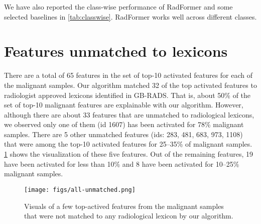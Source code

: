 \documentclass[twocolumn,final]{elsarticle}
\def\myarch{RadFormer\xspace}
\begin{document}
We have also reported the class-wise performance of \myarch and some selected baselines in \cref{tab:classwise}. \myarch works well across different classes. 

\section{Features unmatched to lexicons}
%
There are a total of 65 features in the set of top-10 activated features for each of the malignant samples. Our algorithm matched 32 of the top activated features to radiologist approved lexicons identified in GB-RADS. That is, about 50\% of the set of top-10 malignant features are explainable with our algorithm. However, although there are about 33 features that are unmatched to radiological lexicons, we observed only one of them (id 1607) has been activated for 78\% malignant samples. There are 5 other unmatched features (ids: 283, 481, 683, 973, 1108) that were among the top-10 activated features for 25--35\% of malignant samples. \cref{fig:unknown-new} shows the visualization of these five features. Out of the remaining features, 19 have been activated for less than 10\% and 8 have been activated for 10--25\% malignant samples.

\begin{figure}
    \centering
    \texttt{[image: figs/all-unmatched.png]}
    \caption{Visuals of a few top-actived features from the malignant samples that were not matched to any radiological lexicon by our algorithm.}
    \label{fig:unknown-new}
\end{figure}
\end{document}
